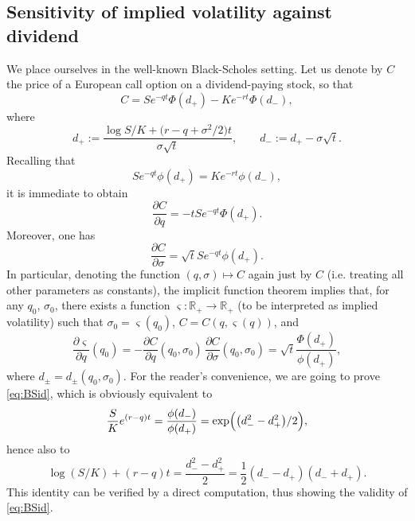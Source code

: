 \documentclass[11pt]{article}
\theoremstyle{remark}
\newcommand{\erre}{\mathbb{R}}
\begin{document}
\subsection{Sensitivity of implied volatility against dividend}
We place ourselves in the well-known Black-Scholes setting. Let us
denote by $C$ the price of a European call option on a dividend-paying
stock, so that
\[
C = Se^{-qt} \Phi(d_+) - Ke^{-rt} \Phi(d_-),
\]
where
\[
d_+ := \frac{\log S/K + \bigl(r-q+\sigma^2/2\bigr)t}{\sigma\sqrt{t}},
\qquad d_- := d_+ - \sigma\sqrt{t}.
\]
Recalling that
\begin{equation}
  \label{eq:BSid}
  Se^{-qt} \phi(d_+) = Ke^{-rt} \phi(d_-),
\end{equation}
it is immediate to obtain
\[
\frac{\partial C}{\partial q} = -tSe^{-qt}\Phi(d_+).
\]
Moreover, one has
\[
\frac{\partial C}{\partial \sigma} = \sqrt{t} S e^{-qt} \phi(d_+).
\]
In particular, denoting the function $(q,\sigma) \mapsto C$ again just
by $C$ (i.e. treating all other parameters as constants), the implicit
function theorem implies that, for any $q_0$, $\sigma_0$, there exists
a function $\varsigma:\erre_+ \to \erre_+$ (to be interpreted as
implied volatility) such that $\sigma_0=\varsigma(q_0)$,
$C=C(q,\varsigma(q))$, and
\[
\frac{\partial \varsigma}{\partial q}(q_0) = 
- \frac{\partial C}{\partial q}(q_0,\sigma_0) \,
  \frac{\partial C}{\partial \sigma}(q_0,\sigma_0)
= \sqrt{t} \frac{\Phi(d_+)}{\phi(d_+)},
\]
where $d_\pm = d_\pm(q_0,\sigma_0)$.
%
For the reader's convenience, we are going to prove \eqref{eq:BSid},
which is obviously equivalent to
\[
\frac{S}{K} e^{(r-q)t} = \frac{\phi(d_-)}{\phi(d_+)} 
= \exp\Bigl( \bigl(d_-^2 - d_+^2\bigr)/2 \Bigr),
\]
hence also to
\[
\log(S/K) + (r-q)t = \frac{d_-^2 - d_+^2}{2} 
= \frac12 (d_--d_+) (d_-+d_+).
\]
This identity can be verified by a direct computation, thus showing
the validity of \eqref{eq:BSid}.




\end{document}
